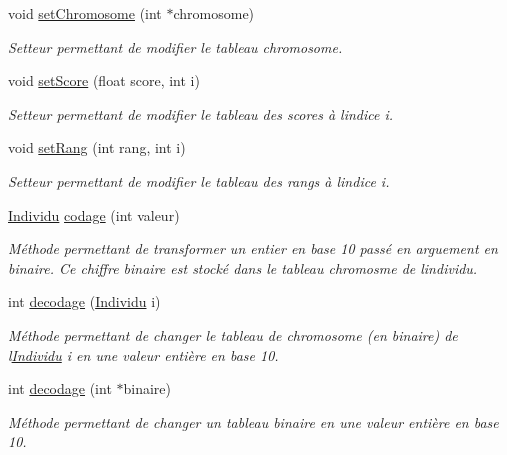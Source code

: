 \begin{DoxyCompactItemize}
void \hyperlink{class_individu_a2d678fe842fa537c79b56775bdd3d64b}{set\+Chromosome} (int $\ast$chromosome)
\begin{DoxyCompactList}\small\item\em Setteur permettant de modifier le tableau chromosome. \end{DoxyCompactList}\item 
void \hyperlink{class_individu_a8904ed048934023929957f6585bc1f7f}{set\+Score} (float score, int i)
\begin{DoxyCompactList}\small\item\em Setteur permettant de modifier le tableau des scores à l\textquotesingle{}indice i. \end{DoxyCompactList}\item 
void \hyperlink{class_individu_ae77745a63cacfdd4504f23ed75e7fca0}{set\+Rang} (int rang, int i)
\begin{DoxyCompactList}\small\item\em Setteur permettant de modifier le tableau des rangs à l\textquotesingle{}indice i. \end{DoxyCompactList}\item 
\hyperlink{class_individu}{Individu} \hyperlink{class_individu_a4e531bc1f39a0f9684b8c9d75fb0fcd1}{codage} (int valeur)
\begin{DoxyCompactList}\small\item\em Méthode permettant de transformer un entier en base 10 passé en arguement en binaire. Ce chiffre binaire est stocké dans le tableau chromosme de l\textquotesingle{}individu. \end{DoxyCompactList}\item 
int \hyperlink{class_individu_a55c07f1851d61efae66419f76db56650}{decodage} (\hyperlink{class_individu}{Individu} i)
\begin{DoxyCompactList}\small\item\em Méthode permettant de changer le tableau de chromosome (en binaire) de l\textquotesingle{}\hyperlink{class_individu}{Individu} i en une valeur entière en base 10. \end{DoxyCompactList}\item 
int \hyperlink{class_individu_ae1312d4f3e30f04bbfdac807ec68b7b6}{decodage} (int $\ast$binaire)
\begin{DoxyCompactList}\small\item\em Méthode permettant de changer un tableau binaire en une valeur entière en base 10. \end{DoxyCompactList}\item 

\end{DoxyCompactItemize}
